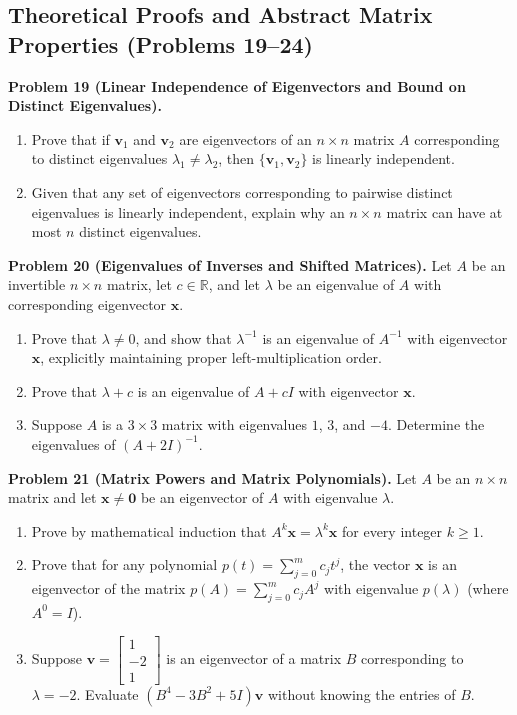 \documentclass[11pt, letterpaper]{article}
\theoremstyle{definition}
\theoremstyle{remark}
\begin{document}
\subsection{Theoretical Proofs and Abstract Matrix Properties (Problems 19--24)}

\textbf{Problem 19 (Linear Independence of Eigenvectors and Bound on Distinct Eigenvalues).}
\begin{enumerate}[label=(\alph*)]
    \item Prove that if $\mathbf{v}_1$ and $\mathbf{v}_2$ are eigenvectors of an $n \times n$ matrix $A$ corresponding to distinct eigenvalues $\lambda_1 \neq \lambda_2$, then $\{\mathbf{v}_1, \mathbf{v}_2\}$ is linearly independent.
    \item Given that any set of eigenvectors corresponding to pairwise distinct eigenvalues is linearly independent, explain why an $n \times n$ matrix can have at most $n$ distinct eigenvalues.
\end{enumerate}

\textbf{Problem 20 (Eigenvalues of Inverses and Shifted Matrices).}
Let $A$ be an invertible $n \times n$ matrix, let $c \in \mathbb{R}$, and let $\lambda$ be an eigenvalue of $A$ with corresponding eigenvector $\mathbf{x}$.
\begin{enumerate}[label=(\alph*)]
    \item Prove that $\lambda \neq 0$, and show that $\lambda^{-1}$ is an eigenvalue of $A^{-1}$ with eigenvector $\mathbf{x}$, explicitly maintaining proper left-multiplication order.
    \item Prove that $\lambda + c$ is an eigenvalue of $A + cI$ with eigenvector $\mathbf{x}$.
    \item Suppose $A$ is a $3 \times 3$ matrix with eigenvalues $1$, $3$, and $-4$. Determine the eigenvalues of $(A + 2I)^{-1}$.
\end{enumerate}

\textbf{Problem 21 (Matrix Powers and Matrix Polynomials).}
Let $A$ be an $n \times n$ matrix and let $\mathbf{x} \neq \mathbf{0}$ be an eigenvector of $A$ with eigenvalue $\lambda$.
\begin{enumerate}[label=(\alph*)]
    \item Prove by mathematical induction that $A^k \mathbf{x} = \lambda^k \mathbf{x}$ for every integer $k \ge 1$.
    \item Prove that for any polynomial $p(t) = \sum_{j=0}^{m} c_j t^j$, the vector $\mathbf{x}$ is an eigenvector of the matrix $p(A) = \sum_{j=0}^{m} c_j A^j$ with eigenvalue $p(\lambda)$ (where $A^0 = I$).
    \item Suppose $\mathbf{v} = \begin{bmatrix} 1 \\ -2 \\ 1 \end{bmatrix}$ is an eigenvector of a matrix $B$ corresponding to $\lambda = -2$. Evaluate $(B^4 - 3B^2 + 5I)\mathbf{v}$ without knowing the entries of $B$.
\end{enumerate}
\end{document}
